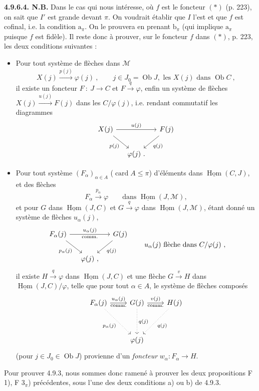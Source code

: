 \documentclass[11pt]{article}
\newcommand{\printedpage}[1]{\marginpar{\footnotesize p.~#1}}
\newcommand{\msp}[1]{\marginpar{\footnotesize [#1]}}
\newcommand{\card}{\operatorname{card}}
\newcommand{\Ob}{\operatorname{Ob}}
\newcommand{\uHom}{\underline{\operatorname{Hom}}}
\newcommand{\cM}{\mathcal{M}}
\begin{document}
\textbf{4.9.6.4. N.B.} Dans le cas qui nous intéresse, où $f$ est le foncteur $(*)$ (p. 223), on sait que $I'$ est grande devant $\pi$. On voudrait établir que $I$ l'est et que $f$ est cofinal, i.e. la condition $\mathrm{a}_\pi$. On le prouvera en prenant $\mathrm{b}_\pi$ (qui implique $\mathrm{a}_\pi$ puisque $f$ est fidèle). Il reste donc à
\msp{page 226}
prouver, sur le foncteur $f$ dans $(*)$, p. 223, les deux conditions suivantes :
\begin{itemize}[label={}]
\item[F 1)] Pour tout système de flèches dans $\cM$
\[
X(j) \xrightarrow{p(j)} \varphi(j) \ , \qquad j \in J_0 = \Ob J, \text{ les } X(j) \text{ dans } \Ob C \ ,
\]
il existe un foncteur $F \ : \ J \longrightarrow C$ et $F \xrightarrow{q} \varphi$, enfin un système de flèches $X(j) \xrightarrow{u(j)} F(j)$ dans les $C/\varphi(j)$, i.e. rendant commutatif les diagrammes %
\[
\begin{tikzcd}[column sep=small]
X(j) \arrow[rr, "u(j)"] \arrow[dr, "p(j)"'] & & F(j) \arrow[dl, "q(j)"] \\
& \varphi(j)\ . &
\end{tikzcd}
\]
\item[F $3_\pi$)] Pour tout système $(F_\alpha)_{\alpha \in A}$ ($\card A \leqslant \pi$) d'éléments dans $\uHom(C,J)$, et des flèches %
\[
F_\alpha \xrightarrow{p_\alpha} \varphi \qquad \text{dans } \uHom(J,\cM),
\]
et pour $G$ dans $\uHom(J,C)$ et $G \xrightarrow{q} \varphi$ dans $\uHom(J,\cM)$, étant donné un système de flèches $u_\alpha(j)$,
\printedpage{83}
\[
\begin{tikzcd}[column sep=small]
F_\alpha(j) \arrow[rr, "u_\alpha(j)", "\text{comm.}"'] \arrow[dr, "p_\alpha(j)"'] & & G(j) \arrow[dl, "q(j)"] \\
& \varphi(j)\ , &
\end{tikzcd}
\qquad u_\alpha(j) \text{ flèche dans } C/\varphi(j) \ ,
\]
il existe $H \xrightarrow{q} \varphi$ dans $\uHom(J,C)$ et une flèche $G \xrightarrow{v} H$ dans $\uHom(J,C)/\varphi$, telle que pour tout $\alpha \in A$, le système de flèches composés
\msp{page 227}
\[
\begin{tikzcd}[row sep=huge]
F_\alpha(j) \arrow[r, "u_\alpha(j)", "\text{comm.}"'] \arrow[dr, dotted, "p_\alpha(j)"'] & G(j) \arrow[r, "v(j)", "\text{comm.}"'] \arrow[d, dotted, "q(j)"] & H(j) \arrow[dl, dotted, "q(j)"] \\
& \varphi(j) &
\end{tikzcd}
\]
(pour $j \in J_0 \in \Ob J$) provienne d'un \textit{foncteur} $w_\alpha : F_\alpha \longrightarrow H$. %
\end{itemize}
Pour prouver 4.9.3, nous sommes donc ramené à prouver les deux propositions F 1), F $3_\pi$) précédentes, sous l'une des deux conditions a) ou b) de 4.9.3.
\end{document}
